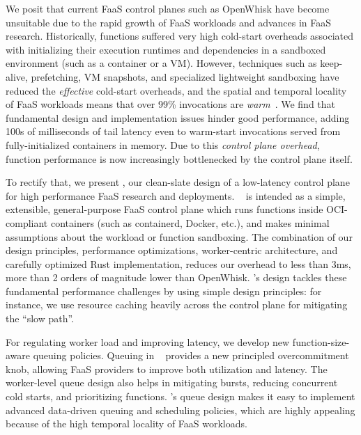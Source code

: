 We posit that current FaaS control planes such as OpenWhisk have become unsuitable due to the rapid growth of FaaS workloads and advances in FaaS research.
Historically, functions suffered very high cold-start overheads associated with initializing their execution runtimes and dependencies in a sandboxed environment (such as a container or a VM).
However, techniques such as keep-alive, prefetching, VM snapshots, and specialized lightweight sandboxing have reduced the \emph{effective} cold-start overheads, and the spatial and temporal locality of FaaS workloads means that over 99\% invocations are \emph{warm}~\cite{faascache-asplos21}.
We find that fundamental design and implementation issues hinder good performance, adding 100s of milliseconds of tail latency even to warm-start invocations served from fully-initialized containers in memory. 
Due to this \emph{control plane overhead}, function performance is now increasingly bottlenecked by the control plane itself.


To rectify that, we present \sysname, our clean-slate design of a low-latency control plane for high performance FaaS research and deployments.
\sysname~ is intended as a simple, extensible, general-purpose FaaS control plane which runs functions inside OCI-compliant containers (such as containerd, Docker, etc.), and makes minimal assumptions about the workload or function sandboxing.
The combination of our design principles, performance optimizations, worker-centric architecture, and carefully optimized Rust implementation, reduces our overhead to less than 3ms, more than 2 orders of magnitude lower than OpenWhisk. 
\sysname's design tackles these fundamental performance challenges by using simple design principles: for instance, we use resource caching heavily across the control plane for mitigating the ``slow path''. 


For regulating worker load and improving latency, we develop new function-size-aware queuing policies.
Queuing in \sysname~ provides a new principled overcommitment knob, allowing FaaS providers to improve both utilization and latency.
The worker-level queue design also helps in mitigating bursts, reducing concurrent cold starts, and prioritizing functions. 
\sysname's queue design makes it easy to implement advanced data-driven queuing and scheduling policies, which are highly appealing because of the high temporal locality of FaaS workloads. 



